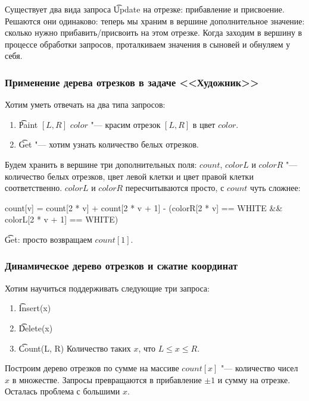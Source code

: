 Существует два вида запроса \t{Update} на отрезке: прибавление и присвоение.
Решаются они одинаково: теперь мы храним в вершине дополнительное значение: сколько нужно прибавить/присвоить на этом отрезке.
Когда заходим в вершину в процессе обработки запросов, проталкиваем значения в сыновей и обнуляем у себя.

\subsubsection{Применение дерева отрезков в задаче <<Художник>>}

Хотим уметь отвечать на два типа запросов:

\begin{enumerate}
	\item \t{Paint} $[L, R]$ $color$ "--- красим отрезок $[L, R]$ в цвет $color$.
	\item \t{Get} "--- хотим узнать количество белых отрезков.
\end{enumerate}

Будем хранить в вершине три дополнительных поля: $count$, $colorL$ и $colorR$ "--- количество белых отрезков, цвет левой клетки и цвет правой клетки соответственно.
$colorL$ и $colorR$ пересчитываются просто, с $count$ чуть сложнее:
\begin{cppcode}
count[v] = count[2 * v] + count[2 * v + 1]
	- (colorR[2 * v] == WHITE && colorL[2 * v + 1] == WHITE)
\end{cppcode}

\t{Get}: просто возвращаем $count[1]$.

\subsubsection{Динамическое дерево отрезков и сжатие координат}

Хотим научиться поддерживать следующие три запроса:
\begin{enumerate}
	\item \t{Insert(x)}
	\item \t{Delete(x)}
	\item \t{Count(L, R)} Количество таких $x$, что $L \le x \le R$.
\end{enumerate}

Построим дерево отрезков по сумме на массиве $count[x]$ "--- количество чисел $x$ в множестве.
Запросы превращаются в прибавление $\pm 1$ и сумму на отрезке.
Осталась проблема с большими $x$.

